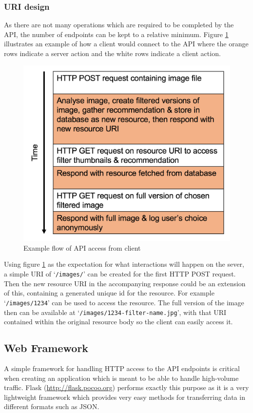 \documentclass[a4paper,12pt]{report}
\begin{document}
      \subsubsection{URI design}
        As there are not many operations which are required to be completed by the API, the number of endpoints can be kept to a relative minimum. Figure \ref{fig:api-call-flow} illustrates an example of how a client would connect to the API where the orange rows indicate a server action and the white rows indicate a client action.

        \begin{figure}[h]
          \centering
          \includegraphics[width=0.5\linewidth]{api-call-flow}
          \caption{Example flow of API access from client}
          \label{fig:api-call-flow}
        \end{figure}

        Using figure \ref{fig:api-call-flow} as the expectation for what interactions will happen on the sever, a simple URI of ‘\texttt{/images/}’ can be created for the first HTTP POST request. Then the new resource URI in the accompanying response could be an extension of this, containing a generated unique id for the resource. For example ‘\texttt{/images/1234}’ can be used to access the resource. The full version of the image then can be available at ‘\texttt{/images/1234-filter-name.jpg}’, with that URI contained within the original resource body so the client can easily access it.

    \subsection{Web Framework}
      A simple framework for handling HTTP access to the API endpoints is critical when creating an application which is meant to be able to handle high-volume traffic. Flask (\url{http://flask.pocoo.org}) performs exactly this purpose as it is a very lightweight framework which provides very easy methods for transferring data in different formats such as JSON.
\end{document}
